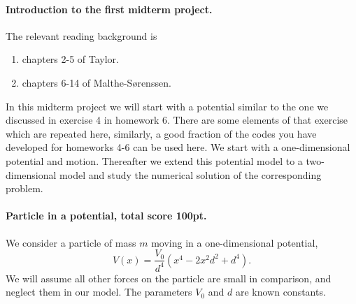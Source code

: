 \documentclass[%
oneside,                 %
final,                   %
10pt]{article}
\begin{document}
\noindent
\paragraph{Introduction to the first midterm project.}
The relevant reading background is
\begin{enumerate}
\item chapters 2-5 of Taylor.

\item chapters 6-14 of Malthe-Sørenssen.
\end{enumerate}

\noindent
In this midterm project we will start with a potential similar to the
one we discussed in exercise 4 in homework 6. There are some elements
of that exercise which are repeated here, similarly, a good fraction
of the codes you have developed for homeworks 4-6 can be used here.
We start with a one-dimensional potential and motion.  Thereafter we
extend this potential model to a two-dimensional model and study the
numerical solution of the corresponding problem.

\paragraph{Particle in a  potential, total score 100pt.}
We consider a particle of mass $m$ moving in a one-dimensional potential,
\[
V(x)=\frac{V_0}{d^4}\left(x^4-2x^2d^2+d^4\right).
\]
We will assume all other forces on the particle are small in comparison, and neglect them in our model.  The parameters $V_0$ and $d$ are known constants. 
\end{document}
